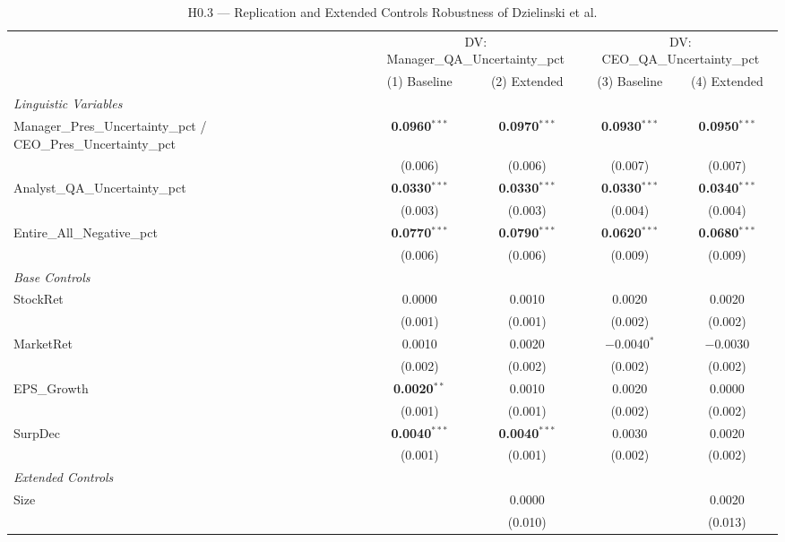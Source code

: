 \documentclass[12pt,a4paper]{article}
\begin{document}
\begin{table}[H]
\centering
\caption{H0.3 --- Replication and Extended Controls Robustness of Dzielinski et al.}
\label{tab:h03}
\begin{threeparttable}
\begin{scriptsize}
\renewcommand{\arraystretch}{0.75}
\begin{tabular}{lcccc}
\toprule
& \multicolumn{2}{c}{DV: Manager\_QA\_Uncertainty\_pct} & \multicolumn{2}{c}{DV: CEO\_QA\_Uncertainty\_pct} \\
\cmidrule(lr){2-3} \cmidrule(lr){4-5}
& (1) Baseline & (2) Extended & (3) Baseline & (4) Extended \\
\midrule
\textit{Linguistic Variables} \\
Manager\_Pres\_Uncertainty\_pct / CEO\_Pres\_Uncertainty\_pct & \textbf{0.0960}$^{***}$ & \textbf{0.0970}$^{***}$ & \textbf{0.0930}$^{***}$ & \textbf{0.0950}$^{***}$ \\
 & (0.006) & (0.006) & (0.007) & (0.007) \\
Analyst\_QA\_Uncertainty\_pct & \textbf{0.0330}$^{***}$ & \textbf{0.0330}$^{***}$ & \textbf{0.0330}$^{***}$ & \textbf{0.0340}$^{***}$ \\
 & (0.003) & (0.003) & (0.004) & (0.004) \\
Entire\_All\_Negative\_pct & \textbf{0.0770}$^{***}$ & \textbf{0.0790}$^{***}$ & \textbf{0.0620}$^{***}$ & \textbf{0.0680}$^{***}$ \\
 & (0.006) & (0.006) & (0.009) & (0.009) \\
\textit{Base Controls} \\
StockRet & 0.0000 & 0.0010 & 0.0020 & 0.0020 \\
 & (0.001) & (0.001) & (0.002) & (0.002) \\
MarketRet & 0.0010 & 0.0020 & $\mathbf{-0.0040}^{*}$ & $-0.0030$ \\
 & (0.002) & (0.002) & (0.002) & (0.002) \\
EPS\_Growth & \textbf{0.0020}$^{**}$ & 0.0010 & 0.0020 & 0.0000 \\
 & (0.001) & (0.001) & (0.002) & (0.002) \\
SurpDec & \textbf{0.0040}$^{***}$ & \textbf{0.0040}$^{***}$ & 0.0030 & 0.0020 \\
 & (0.001) & (0.001) & (0.002) & (0.002) \\
\textit{Extended Controls} \\
Size & & 0.0000 & & 0.0020 \\
 & & (0.010) & & (0.013) \\

\end{tabular}
\end{scriptsize}
\end{threeparttable}
\end{table}
\end{document}

